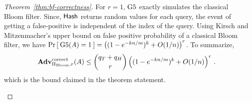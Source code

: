 \begin{proof}[Theorem~\ref{thm:bf-correctness}]
For $r=1$, $\text{G5}$ exactly simulates the classical Bloom filter. Since, $\mathsf{Hash}$ returns random values for each query, the event of getting a false-positive is independent of the index of the query. Using Kirsch and Mitzenmacher's upper bound on false positive probability of a classical Bloom filter, we have  $\Pr\left[\: \text{G5}(A)=1 \:\right] = \left( (1-e^{-kn/m})^k + O(1/n) \right)^r$.
To summarize, 
\[
\mathrm{\mathbf{Adv}}^{\mathrm{correct}}_{\Pi_{\mathrm{Bloom}},r}(A) \leq  {\dbinom{q_T + q_H}{r}} \left( (1-e^{-kn/m})^k + O(1/n) \right)^r\,.
\]
which is the bound claimed in the theorem statement.
\begin{figure}[tp]
\end{figure}
\end{proof}
